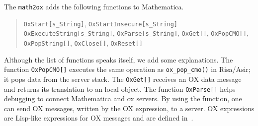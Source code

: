 \noindent
The {\tt math2ox} adds the following functions to Mathematica.
\begin{quote}
{\tt OxStart[s\_String]},
{\tt OxStartInsecure[s\_String]} \\
{\tt OxExecuteString[s\_String]},
{\tt OxParse[s\_String]},
{\tt OxGet[]},
{\tt OxPopCMO[]},
{\tt OxPopString[]},
{\tt OxClose[]},
{\tt OxReset[]}
\end{quote}
Although the list of functions speaks itself,
we add some explanations.
The function {\tt OxPopCMO[]} executes the same operation
as {\tt ox\_pop\_cmo()} in Risa/Asir;
it pops data from the server stack.
The {\tt OxGet[]} receives an OX data message
and returns its translation to an local object.
The function {\tt OxParse[]} helps debugging to connect Mathematica
and ox servers.
By using the function, one can send OX messages,
written by the OX expression, to a server. 
OX expressions are Lisp-like expressions for OX messages and are defined
in~\cite{noro-takayama}.  
